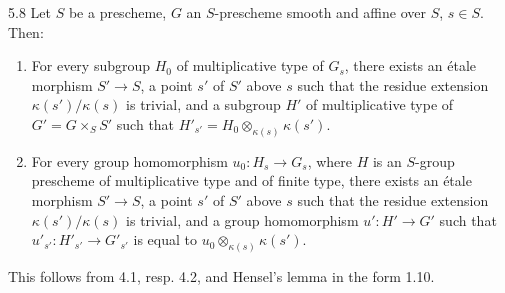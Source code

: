 \begin{theorem}{5.8}\label{XI.5.8}
Let $S$ be a prescheme, $G$ an $S$-prescheme smooth and affine over $S$, $s\in S$. Then:
\begin{enumerate}[label=\alph*)]
\item For every subgroup $H_0$ of multiplicative type of $G_s$, there exists an étale morphism $S'\to S$, a point $s'$ of $S'$ above $s$ such that the residue extension $\kappa(s')/\kappa(s)$ is trivial, and a subgroup $H'$ of multiplicative type of $G'=G\times_S S'$ such that $H'_{s'}=H_0\otimes_{\kappa(s)}\kappa(s')$.
\item For every group homomorphism $u_0:H_s\to G_s$, where $H$ is an $S$-group prescheme of multiplicative type and of finite type, there exists an étale morphism $S'\to S$, a point $s'$ of $S'$ above $s$ such that the residue extension $\kappa(s')/\kappa(s)$ is trivial, and a group homomorphism $u':H'\to G'$ such that $u'_{s'}:H'_{s'}\to G'_{s'}$ is equal to $u_0\otimes_{\kappa(s)}\kappa(s')$.
\end{enumerate}
\end{theorem}
This follows from 4.1, resp. 4.2, and Hensel's lemma in the form 1.10.

